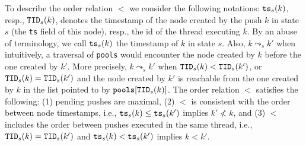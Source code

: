 To describe the order relation $<$ we consider the following notations: ${\tt ts}_s(k)$, resp., ${\tt TID}_s(k)$, denotes the timestamp of the node created by the push $k$ in state $s$ (the {\tt ts} field of this node), resp., the id of the thread executing $k$. By an abuse of terminology, we call ${\tt ts}_s(k)$ the timestamp of $k$ in state $s$.
Also, $k \leadsto_s k'$ when intuitively, a traversal of {\tt pools}  would encounter the node created by $k$ before the one created by $k'$. More precisely, $k \leadsto_s k'$ when ${\tt TID}_s(k) < {\tt TID}_s(k')$, or ${\tt TID}_s(k) = {\tt TID}_s(k')$ and the node created by $k'$ is reachable from the one created by $k$ in the list pointed to by ${\tt pools}[{\tt TID}_s(k)]$.
The order relation $<$ satisfies the following: (1) pending pushes are maximal, (2) $<$ is consistent with the order between node timestamps, i.e., ${\tt ts}_s(k) \leq {\tt ts}_s(k')$ implies $k'\not< k$, and (3) $<$ includes the order between pushes executed in the same thread, i.e., ${\tt TID}_s(k) = {\tt TID}_s(k')$ and ${\tt ts}_s(k) < {\tt ts}_s(k')$ implies $k < k'$.

